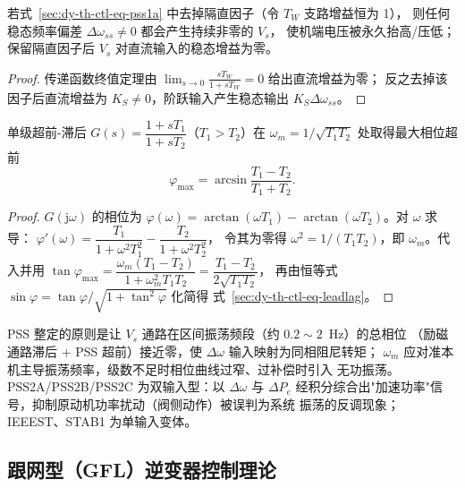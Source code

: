 \begin{proposition}[隔直环节的必要性]\label{sec:dy-th-ctl-prop-washout}
若式~\eqref{sec:dy-th-ctl-eq-pss1a} 中去掉隔直因子（令 $T_W$ 支路增益恒为 1），
则任何稳态频率偏差 $\Delta\omega_{ss}\neq0$ 都会产生持续非零的 $V_s$，
使机端电压被永久抬高/压低；保留隔直因子后 $V_s$ 对直流输入的稳态增益为零。
\end{proposition}

\begin{proof}
传递函数终值定理由 $\lim_{s\to0}\frac{sT_W}{1+sT_W}=0$ 给出直流增益为零；
反之去掉该因子后直流增益为 $K_S\neq0$，阶跃输入产生稳态输出 $K_S\Delta\omega_{ss}$。
\end{proof}

\begin{proposition}[超前-滞后的相位补偿]\label{sec:dy-th-ctl-prop-leadlag}
单级超前-滞后 $G(s)=\dfrac{1+sT_1}{1+sT_2}$（$T_1>T_2$）在
$\omega_m=1/\sqrt{T_1T_2}$ 处取得最大相位超前
\begin{equation}
\varphi_{\max}=\arcsin\frac{T_1-T_2}{T_1+T_2}.
\label{sec:dy-th-ctl-eq-leadlag}
\end{equation}
\end{proposition}

\begin{proof}
$G(\mathrm j\omega)$ 的相位为
$\varphi(\omega)=\arctan(\omega T_1)-\arctan(\omega T_2)$。对 $\omega$ 求导：
$\varphi'(\omega)=\dfrac{T_1}{1+\omega^2T_1^2}-\dfrac{T_2}{1+\omega^2T_2^2}$，
令其为零得 $\omega^2=1/(T_1T_2)$，即 $\omega_m$。代入并用
$\tan\varphi_{\max}=\dfrac{\omega_m(T_1-T_2)}{1+\omega_m^2T_1T_2}
=\dfrac{T_1-T_2}{2\sqrt{T_1T_2}}$，
再由恒等式 $\sin\varphi=\tan\varphi/\sqrt{1+\tan^2\varphi}$ 化简得
式~\eqref{sec:dy-th-ctl-eq-leadlag}。
\end{proof}

\begin{remark}
PSS 整定的原则是让 $V_s$ 通路在区间振荡频段（约 $0.2\sim2$~Hz）的总相位
（励磁通路滞后 $+$ PSS 超前）接近零，使 $\Delta\omega$ 输入映射为同相阻尼转矩；
$\omega_m$ 应对准本机主导振荡频率，级数不足时相位曲线过窄、过补偿时引入
无功振荡。PSS2A/PSS2B/PSS2C 为双输入型：以 $\Delta\omega$ 与 $\Delta P_e$
经积分综合出"加速功率"信号，抑制原动机功率扰动（阀侧动作）被误判为系统
振荡的反调现象；IEEEST、STAB1 为单输入变体。
\end{remark}

\subsection{跟网型（GFL）逆变器控制理论}\label{sec:dy-th-ctl-gfl}

